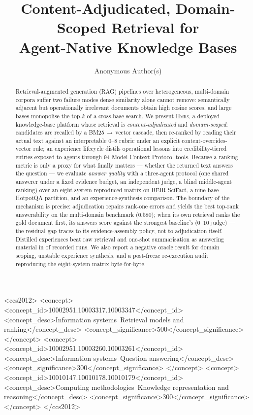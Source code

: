 \documentclass[sigconf, review, anonymous]{acmart}
\newcommand{\sys}{\textsc{Hmrs}}
\begin{document}
\title{Content-Adjudicated, Domain-Scoped Retrieval for\\ Agent-Native Knowledge Bases}

\author{Anonymous Author(s)}

\begin{abstract}
Retrieval-augmented generation (RAG) pipelines over heterogeneous, multi-domain
corpora suffer two failure modes dense similarity alone cannot remove:
semantically adjacent but operationally irrelevant documents obtain high cosine
scores, and large bases monopolise the top-$k$ of a cross-base search. We
present \sys{}, a deployed knowledge-base platform whose retrieval is
\emph{content-adjudicated} and \emph{domain-scoped}: candidates are recalled by
a BM25\,$\rightarrow$\,vector cascade, then re-ranked by reading their actual
text against an interpretable $0$--$8$ rubric under an explicit
content-overrides-vector rule; an experience lifecycle distils operational
lessons into credibility-tiered entries exposed to agents through 94 Model
Context Protocol tools. Because a ranking metric is only a proxy for what
finally matters --- whether the returned text answers the question --- we
evaluate \emph{answer quality} with a three-agent protocol (one shared
answerer under a fixed evidence budget, an independent judge, a blind
middle-agent ranking) over an eight-system reproduced matrix on BEIR SciFact,
a nine-base HotpotQA partition, and an experience-synthesis comparison. The
boundary of the mechanism is precise: adjudication repairs rank-one errors
and yields the best top-rank answerability on the multi-domain benchmark
($0.580$); when its own retrieval ranks the gold document first, its answers
score \hmrsJhit{} against the strongest baseline's \denseJhit{} ($0$--$10$
judge) --- the residual gap traces to its evidence-assembly policy, not to
adjudication itself. Distilled experiences beat raw retrieval and one-shot summarisation as
answering material in \eFourFirsts{} of \eFourRuns{} recorded runs. We also
report a negative oracle result for domain scoping, unstable experience
synthesis, and a post-freeze re-execution audit reproducing the eight-system
matrix byte-for-byte.
\end{abstract}
\begin{CCSXML}
<ccs2012>
<concept>
<concept_id>10002951.10003317.10003347</concept_id>
<concept_desc>Information systems~Retrieval models and ranking</concept_desc>
<concept_significance>500</concept_significance>
</concept>
<concept>
<concept_id>10002951.10003260.10003261</concept_id>
<concept_desc>Information systems~Question answering</concept_desc>
<concept_significance>300</concept_significance>
</concept>
<concept>
<concept_id>10010147.10010178.10010179</concept_id>
<concept_desc>Computing methodologies~Knowledge representation and reasoning</concept_desc>
<concept_significance>300</concept_significance>
</concept>
</ccs2012>
\end{CCSXML}
\end{document}
